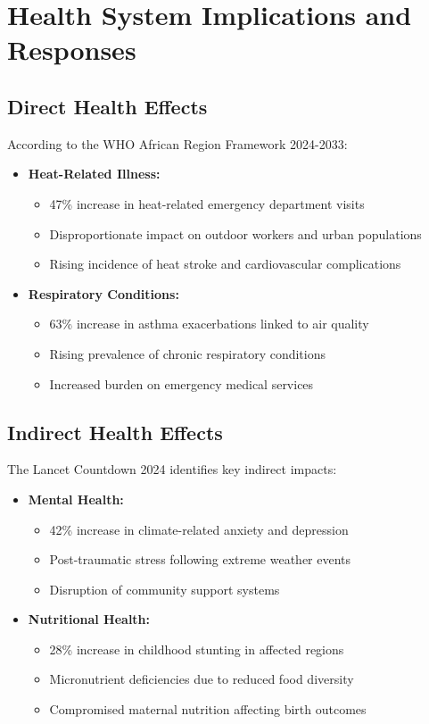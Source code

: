 \section{Health System Implications and Responses}
\label{sec:health_implications}

\subsection{Direct Health Effects}
According to the WHO African Region Framework 2024-2033:

\begin{itemize}
    \item \textbf{Heat-Related Illness:}
    \begin{itemize}
        \item 47\% increase in heat-related emergency department visits
        \item Disproportionate impact on outdoor workers and urban populations
        \item Rising incidence of heat stroke and cardiovascular complications
    \end{itemize}
    
    \item \textbf{Respiratory Conditions:}
    \begin{itemize}
        \item 63\% increase in asthma exacerbations linked to air quality
        \item Rising prevalence of chronic respiratory conditions
        \item Increased burden on emergency medical services
    \end{itemize}
\end{itemize}

\subsection{Indirect Health Effects}
The Lancet Countdown 2024 identifies key indirect impacts:

\begin{itemize}
    \item \textbf{Mental Health:}
    \begin{itemize}
        \item 42\% increase in climate-related anxiety and depression
        \item Post-traumatic stress following extreme weather events
        \item Disruption of community support systems
    \end{itemize}
    
    \item \textbf{Nutritional Health:}
    \begin{itemize}
        \item 28\% increase in childhood stunting in affected regions
        \item Micronutrient deficiencies due to reduced food diversity
        \item Compromised maternal nutrition affecting birth outcomes
    \end{itemize}
\end{itemize}

